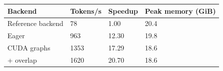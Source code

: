 \begin{tabular}{llll}
\toprule
Backend & Tokens/s & Speedup & Peak memory (GiB) \\
\midrule
Reference backend & 78 & 1.00 & 20.4 \\
Eager & 963 & 12.30 & 19.8 \\
CUDA graphs & 1353 & 17.29 & 18.6 \\
+ overlap & 1620 & 20.70 & 18.6 \\
\bottomrule
\end{tabular}
